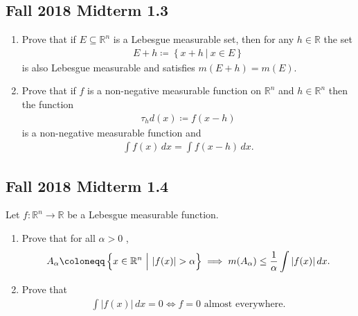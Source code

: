 \hypertarget{fall-2018-midterm-1.3}{%
\subsection{Fall 2018 Midterm 1.3}\label{fall-2018-midterm-1.3}}

\begin{enumerate}
\def\labelenumi{\alph{enumi}.}
\item
  Prove that if \(E \subseteq {\mathbb{R}}^n\) is a Lebesgue measurable
  set, then for any \(h \in {\mathbb{R}}\) the set
  \begin{align*}
  E+h \coloneqq\left\{{x + h {~\mathrel{\Big\vert}~}x\in E }\right\}
  \end{align*}
  is also Lebesgue measurable and satisfies \(m(E + h) = m(E)\).
\item
  Prove that if \(f\) is a non-negative measurable function on
  \({\mathbb{R}}^n\) and \(h\in {\mathbb{R}}^n\) then the function
  \begin{align*}
  \tau_h d(x) \coloneqq f(x-h)
  \end{align*}
  is a non-negative measurable function and
  \begin{align*}
  \int f(x) \,dx= \int f(x-h) \,dx
  .\end{align*}
\end{enumerate}

\hypertarget{fall-2018-midterm-1.4}{%
\subsection{Fall 2018 Midterm 1.4}\label{fall-2018-midterm-1.4}}

Let \(f: {\mathbb{R}}^n\to {\mathbb{R}}\) be a Lebesgue measurable
function.

\begin{enumerate}
\def\labelenumi{\alph{enumi}.}
\item
  Prove that for all \(\alpha> 0\) ,
  \begin{align*}
  A_ \alpha  \coloneqq\left\{{x\in {\mathbb{R}}^n {~\mathrel{\Big\vert}~}{\left\lvert { f(x) } \right\rvert} > \alpha}\right\} \implies m(A_ \alpha) \leq {1\over \alpha} \int {\left\lvert {f (x)} \right\rvert} \,dx
  .\end{align*}
\item
  Prove that
  \begin{align*}
  \int {\left\lvert { f(x) } \right\rvert} \,dx= 0 \iff f = 0 \text{ almost everywhere}
  .\end{align*}
\end{enumerate}

